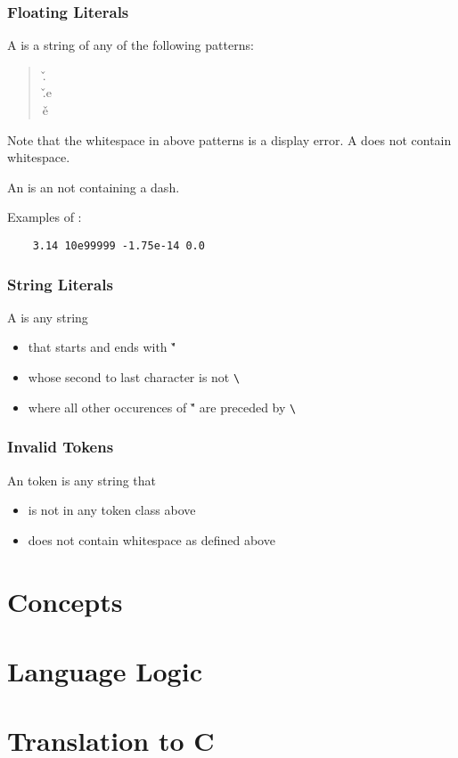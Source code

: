 \documentclass{article}
\begin{document}
\subsubsection{Floating Literals}
A \tfl is a string of any of the following patterns:
\begin{quote}
    \tint\v.\tuint\\
    \tint\v.\tuint e\tint\\
    \tint\v e\tint\\
\end{quote}
Note that the whitespace in above patterns is 
a display error. A \tfl does not contain whitespace.

An \tuint is an \tint not containing a dash.

Examples of \tfl:
\begin{verbatim}
    3.14 10e99999 -1.75e-14 0.0
\end{verbatim}

\fi
\subsubsection{String Literals}
A \tstr is any string
\begin{itemize}
    \item that starts and ends with \v"
    \item whose second to last character is not \verb$\$
    \item where all other occurences of \v" are preceded by \verb$\$
\end{itemize}
\subsubsection{Invalid Tokens}
An \tinv token is any string that
\begin{itemize}
    \item is not in any token class above
    \item does not contain whitespace as defined above
\end{itemize}

\section{Concepts}
\section{Language Logic}
\section{Translation to C}
\end{document}
